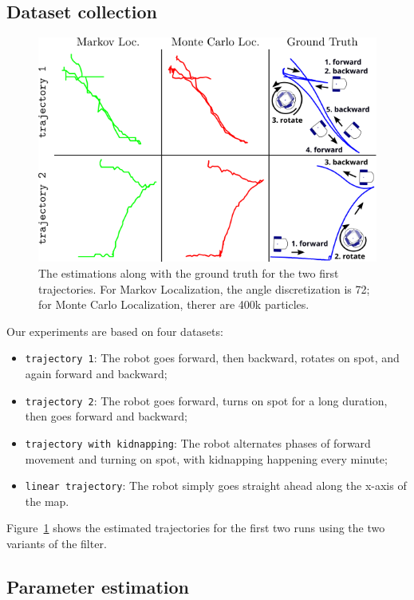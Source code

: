 \documentclass[letterpaper, 10pt, conference]{ieeeconf}
\newcommand{\Fig}[1]{Figure~\ref{fig:#1}}
\begin{document}
\subsection{Dataset collection}

\begin{figure}
\includegraphics{trajectories}
\caption{The estimations along with the ground truth for the two first trajectories.
For Markov Localization, the angle discretization is 72; for Monte Carlo Localization, therer are 400k particles.
}
\label{fig:trajectories}
\end{figure}

Our experiments are based on four datasets:
\begin{itemize}
\item \texttt{trajectory~1}: The robot goes forward, then backward, rotates on spot, and again forward and backward;
\item \texttt{trajectory~2}: The robot goes forward, turns on spot for a long duration, then goes forward and backward;
\item \texttt{trajectory with kidnapping}: The robot alternates phases of forward movement and turning on spot, with kidnapping happening every minute;
\item \texttt{linear trajectory}: The robot simply goes straight ahead along the x-axis of the map.
\end{itemize}
\Fig{trajectories} shows the estimated trajectories for the first two runs using the two variants of the filter.

\subsection{Parameter estimation}
\label{sec:mle}
\end{document}
